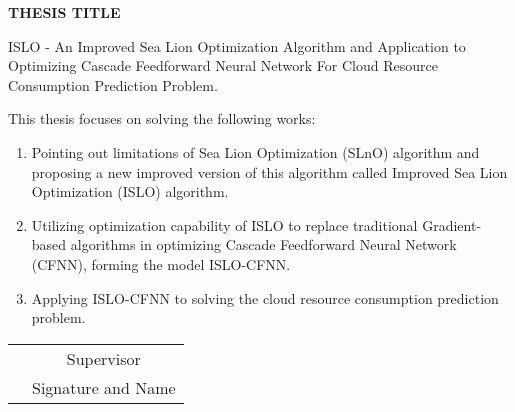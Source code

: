 \documentclass[../main.tex]{subfiles}
\begin{document}
\begin{center}
    \textbf{THESIS TITLE}\
\end{center}
ISLO - An Improved Sea Lion Optimization Algorithm and Application to Optimizing Cascade Feedforward Neural Network For Cloud Resource Consumption Prediction Problem.

This thesis focuses on solving the following works:
\begin{enumerate}
	\item Pointing out limitations of Sea Lion Optimization (SLnO) algorithm and proposing a new improved version of this algorithm called Improved Sea Lion Optimization (ISLO) algorithm.
	\item Utilizing optimization capability of ISLO to replace traditional Gradient-based algorithms in optimizing Cascade Feedforward Neural Network (CFNN), forming the model ISLO-CFNN.
	\item Applying ISLO-CFNN to solving the cloud resource consumption prediction problem.
\end{enumerate} 

\vspace{10cm}


\begin{table}[H]
\centering
\begin{tabular}{p{5cm} c}
\multicolumn{1}{c}{\textbf{}} & Supervisor \\
\textbf{}                     & \small{Signature and Name}
\end{tabular}
\end{table}
\end{document}
